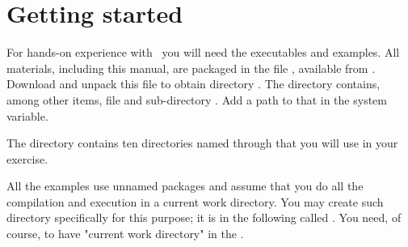 
\section{Getting started}


For hands-on experience with \Mouse\ you will need the executables
and examples.\newline
All materials, including this manual, 
are packaged in the  file ,
available from .
Download and unpack this file to obtain directory .
The directory contains, among other items,
 file  and sub-directory . 
Add a path to that  in the  system variable.

The  directory contains
ten directories named  through 
that you will use in your exercise.

All the examples use unnamed packages and assume that you
do all the compilation and execution in a current work directory.
You may create such directory specifically for this purpose;
it is in the following called .
You need, of course, to have "current work directory" 
in the .
